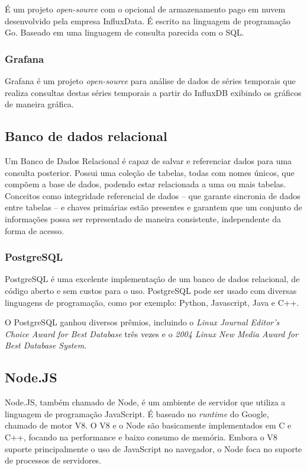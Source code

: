 É um projeto \textit{open-source} com o opcional de armazenamento pago em nuvem desenvolvido pela empresa InfluxData. É escrito na linguagem de programação Go. Baseado em uma linguagem de consulta parecida com o SQL. \cite{Noor2017}

\subsubsection{Grafana}

Grafana é um projeto \textit{open-source} para análise de dados de séries temporais  \cite{Noor2017} que realiza consultas destas séries temporais a partir do InfluxDB exibindo os gráficos de maneira gráfica.\cite{chang2017kubernetes}

\subsection{Banco de dados relacional}

Um Banco de Dados Relacional é capaz de salvar e referenciar dados para uma consulta posterior. Possui uma coleção de tabelas, todas com nomes únicos, que compõem a base de
dados, podendo estar relacionada a uma ou mais tabelas. Conceitos como integridade referencial de dados – que garante sincronia de dados entre tabelas – e chaves primárias estão presentes e garantem que um conjunto de informações possa ser representado de maneira consistente, independente da forma de acesso. \cite{bancosrelacionais}

\subsubsection{PostgreSQL}

PostgreSQL é uma excelente implementação de um banco de dados relacional, de código aberto e sem custos para o uso. \cite{stones2006beginning}
PostgreSQL pode ser usado com diversas linguagens de programação, como por exemplo: Python, Javascript, Java e C++.

O PostgreSQL ganhou diversos prêmios, incluindo o \textit{Linux Journal Editor's Choice Award for Best Database} três vezes e o \textit{2004 Linux New Media Award for Best Database System}.

\subsection{Node.JS}

Node.JS, também chamado de Node, é um ambiente de servidor que utiliza a linguagem de programação JavaScript. É baseado no \textit{runtime} do Google, chamado de motor V8. O V8 e o Node são basicamente implementados em C e C++, focando na performance e baixo consumo de memória. Embora o V8 suporte principalmente o uso de JavaScript no navegador, o Node foca no suporte de processos de servidores. \cite{Tilkov2010}

